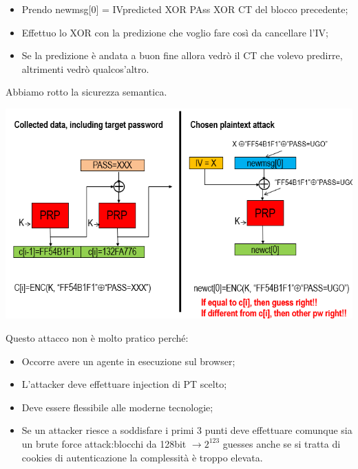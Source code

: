 \documentclass{book}
\theoremstyle{remark}
\begin{document}
\begin{itemize}
	\item Prendo newmsg[0] = IVpredicted XOR PAss XOR CT del blocco precedente;\@
	\item Effettuo lo XOR con la predizione che voglio fare così da cancellare l'IV;\@
	\item Se la predizione è andata a buon fine allora vedrò il CT che volevo predirre, altrimenti vedrò qualcos'altro\@.
\end{itemize}
Abbiamo rotto la sicurezza semantica\@.\begin{center}
	\includegraphics[scale=0.6]{BEASTIVPRED.png}
\end{center}
Questo attacco non è molto pratico perché:\begin{itemize}
	\item Occorre avere un agente in esecuzione sul browser;\@
	\item L'attacker deve effettuare injection di PT scelto;\@
	\item Deve essere flessibile alle moderne tecnologie;\@
	\item Se un attacker riesce a soddisfare i primi  3 punti deve effettuare comunque sia un brute force attack:\@AES blocchi da 128bit \(\rightarrow 2^{123}\) guesses anche se si tratta di cookies di autenticazione la complessità è troppo elevata\@.
\end{itemize}
\end{document}
